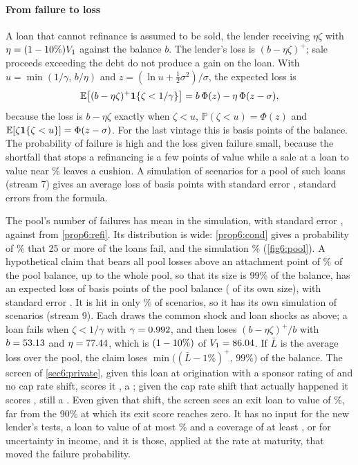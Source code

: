 \begin{chapterrefs}
\paragraph{From failure to loss}
A loan that cannot refinance is assumed to be sold, the lender receiving $\eta\zeta$ with
$\eta=(1-10\%)V_1$ against the balance $b$. The lender's loss is $(b-\eta\zeta)^+$; sale
proceeds exceeding the debt do not produce a gain on the loan. With $u=\min(1/\gamma,\,b/\eta)$ and
$z=(\ln u+\tfrac12\sigma^2)/\sigma$, the expected loss is
\[
  \mathbb{E}\bigl[(b-\eta\zeta)^+\mathbf 1\{\zeta<1/\gamma\}\bigr]=b\,\Phi(z)-\eta\,\Phi(z-\sigma),
\]
because the loss is $b-\eta\zeta$ exactly when $\zeta<u$, $\mathbb P(\zeta<u)=\Phi(z)$ and $\mathbb{E}[\zeta\mathbf 1\{\zeta<u\}]=\Phi(z-\sigma)$.
For the last vintage this is \csEl{} basis points of the balance. The probability of failure is high
and the loss given failure small, because the shortfall that stops a refinancing is a few points of
value while a sale at a loan to value near \csLastLtvOne\% leaves a cushion. A simulation of
\csMcScen{} scenarios for a pool of \csLoans{} such loans (stream 7) gives an average loss of
\csMcEl{} basis points with standard error \csMcElSE, \csMcElZ{} standard errors from the formula.

The pool's number of failures has mean \csMcMeanFail{} in the simulation, with standard error
\csMcMeanFailSE, against \csMeanFail{} from \cref{prop6:refi}. Its distribution is wide:
\cref{prop6:cond} gives a probability of \csPoolTail\% that 25 or more of the \csLoans{} loans fail,
and the simulation \csPoolTailMc\% (\cref{fig6:pool}). A hypothetical claim that bears all pool losses above an attachment point of \csAttach\% of the
pool balance, up to the whole pool, so that its size is 99\% of the balance, has an expected loss of
\csSenEl{} basis points of the pool balance (\csSenElOwn{} of its own size), with standard error
\csSenElSE. It is hit in only \csSenPHit\% of scenarios, so it has its own simulation of
\csSenScen{} scenarios (stream 9). Each draws the common shock and \csLoans{} loan shocks as above;
a loan fails when $\zeta<1/\gamma$ with $\gamma=0.992$, and then loses
$(b-\eta\zeta)^+/b$ with $b=53.13$ and $\eta=77.44$, which is $(1-10\%)$ of $V_1=86.04$.
If $\bar L$ is the average loss over the pool, the claim loses $\min\bigl((\bar L-1\%)^+,\,99\%\bigr)$
of the balance. The screen of \cref{sec6:private},
given this loan at origination with a sponsor rating of \csSponsor{} and no cap rate shift, scores it \csScore, a \csGrade; given the cap rate
shift that actually happened it scores \csScoreReal, still a \csGradeReal. Even given that shift, the
screen sees an exit loan to value of \csScreenExitLtv\%, far from the 90\% at which its exit score
reaches zero. It has no input for the new lender's tests, a loan to value of at most \csLtv\% and a
coverage of at least \csDscrMin, or for uncertainty in income, and it is those, applied at the rate at
maturity, that moved the failure probability.


\end{chapterrefs}
